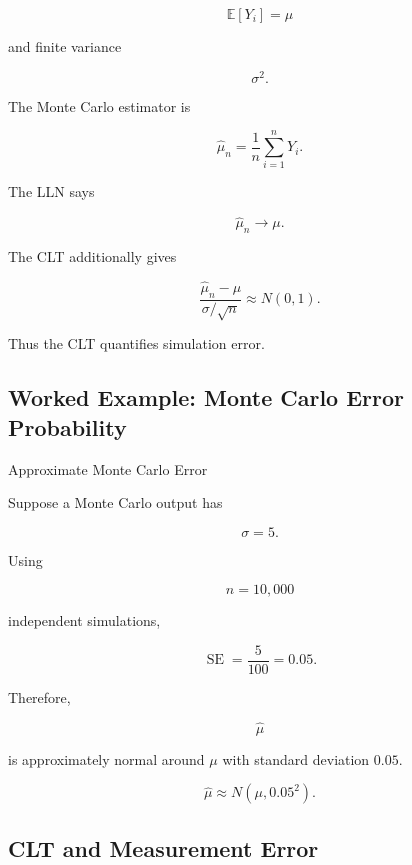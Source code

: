 \[
\mathbb{E}[Y_i]=\mu
\]

and finite variance

\[
\sigma^2.
\]

The Monte Carlo estimator is

\[
\widehat{\mu}_n
=
\frac1n
\sum_{i=1}^{n}Y_i.
\]

The LLN says

\[
\widehat{\mu}_n
\to
\mu.
\]

The CLT additionally gives

\[
\boxed{
\frac{
\widehat{\mu}_n-\mu
}{
\sigma/\sqrt{n}
}
\approx
N(0,1).
}
\]

Thus the CLT quantifies simulation error.

\subsection{Worked Example: Monte Carlo Error Probability}
\label{subsec:worked-monte-carlo-clt}

\begin{workedexamplebox}{Approximate Monte Carlo Error}

Suppose a Monte Carlo output has

\[
\sigma=5.
\]

Using

\[
n=10{,}000
\]

independent simulations,

\[
\operatorname{SE}
=
\frac5{100}
=
0.05.
\]

Therefore,

\[
\widehat{\mu}
\]

is approximately normal around \(\mu\) with standard deviation \(0.05\).

\begin{answerbox}
\[
\boxed{
\widehat{\mu}
\approx
N(\mu,0.05^2).
}
\]
\end{answerbox}

\end{workedexamplebox}

\subsection{CLT and Measurement Error}
\label{subsec:clt-measurement-error}

